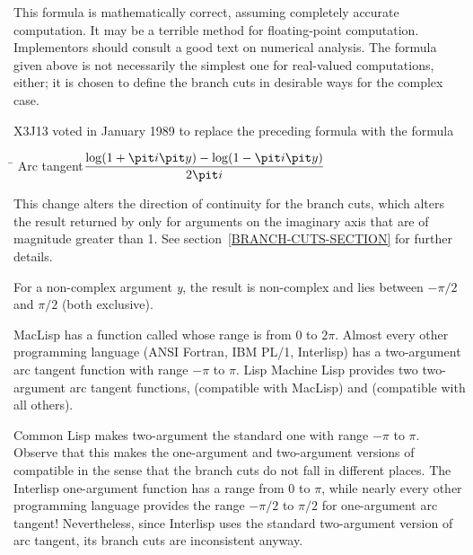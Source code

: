 \begin{defun}[Function]
\newpage%

\beforenoterule
\begin{implementation}
This formula is mathematically correct, assuming
completely accurate computation.  It may be a terrible method for
floating-point computation.  Implementors should consult a good text on
numerical analysis.  The formula given above is not necessarily
the simplest one for real-valued computations, either; it is chosen
to define the branch cuts in desirable ways for the complex case.
\end{implementation}
\afternoterule

\begin{new}
X3J13 voted in January 1989
to replace the preceding formula with the formula
\begin{tabbing}
\hskip 10pc\=\kill
Arc tangent\>$ \displaystyle { \log (1+{\it i}{\it y}) - \log (1-{\it i}{\it y}) \over 2{\it i} } $
\end{tabbing}
This change alters the direction of continuity for the
branch cuts, which alters the result returned by 
only for arguments on the imaginary axis that
are of magnitude greater than 1.
See section~\ref{BRANCH-CUTS-SECTION} for further details.
\end{new}

For a non-complex argument {\it y}, the result is non-complex and lies between
$-\pi/2$ and $\pi/2$ (both exclusive).

\beforenoterule
\begin{incompatibility}
MacLisp has a function called  whose
range is from 0 to $2\pi$.  Almost every other programming language
(ANSI Fortran, IBM PL/1, Interlisp) has a two-argument arc tangent
function with range $-\pi$ to $\pi$.
Lisp Machine Lisp provides two two-argument
arc tangent functions,  (compatible with MacLisp)
and  (compatible with all others).

Common Lisp makes two-argument  the standard one
with range $-\pi$ to $\pi$.  Observe that this makes
the one-argument and two-argument versions of  compatible
in the sense that the branch cuts do not fall in different places.
The Interlisp one-argument function  has a range
from 0 to $\pi$, while nearly every other programming language
provides the range $-\pi/2$ to $\pi/2$ for
one-argument arc tangent!
Nevertheless, since Interlisp uses the standard two-argument
version of arc tangent, its branch cuts are inconsistent anyway.
\end{incompatibility}
\afternoterule
\end{defun}

